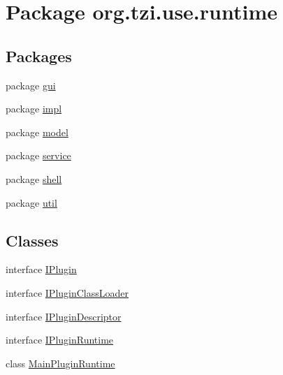 \hypertarget{namespaceorg_1_1tzi_1_1use_1_1runtime}{\section{Package org.\-tzi.\-use.\-runtime}
\label{namespaceorg_1_1tzi_1_1use_1_1runtime}
}
\subsection*{Packages}
\begin{DoxyCompactItemize}
\item 
package \hyperlink{namespaceorg_1_1tzi_1_1use_1_1runtime_1_1gui}{gui}
\item 
package \hyperlink{namespaceorg_1_1tzi_1_1use_1_1runtime_1_1impl}{impl}
\item 
package \hyperlink{namespaceorg_1_1tzi_1_1use_1_1runtime_1_1model}{model}
\item 
package \hyperlink{namespaceorg_1_1tzi_1_1use_1_1runtime_1_1service}{service}
\item 
package \hyperlink{namespaceorg_1_1tzi_1_1use_1_1runtime_1_1shell}{shell}
\item 
package \hyperlink{namespaceorg_1_1tzi_1_1use_1_1runtime_1_1util}{util}
\end{DoxyCompactItemize}
\subsection*{Classes}
\begin{DoxyCompactItemize}
\item 
interface \hyperlink{interfaceorg_1_1tzi_1_1use_1_1runtime_1_1_i_plugin}{I\-Plugin}
\item 
interface \hyperlink{interfaceorg_1_1tzi_1_1use_1_1runtime_1_1_i_plugin_class_loader}{I\-Plugin\-Class\-Loader}
\item 
interface \hyperlink{interfaceorg_1_1tzi_1_1use_1_1runtime_1_1_i_plugin_descriptor}{I\-Plugin\-Descriptor}
\item 
interface \hyperlink{interfaceorg_1_1tzi_1_1use_1_1runtime_1_1_i_plugin_runtime}{I\-Plugin\-Runtime}
\item 
class \hyperlink{classorg_1_1tzi_1_1use_1_1runtime_1_1_main_plugin_runtime}{Main\-Plugin\-Runtime}
\end{DoxyCompactItemize}

